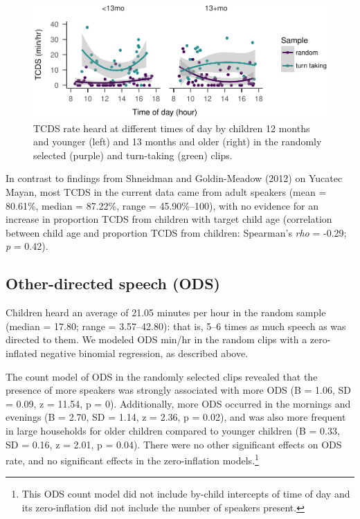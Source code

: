 \documentclass[floatsintext,man]{apa6}
\theoremstyle{definition}
\theoremstyle{definition}
\theoremstyle{definition}
\theoremstyle{remark}
\begin{document}
\begin{figure}
\centering
\includegraphics{Tseltal-CLE_files/figure-latex/fig5-1.pdf}
\caption{\label{fig:fig5}TCDS rate heard at different times of day by
children 12 months and younger (left) and 13 months and older (right) in
the randomly selected (purple) and turn-taking (green) clips.}
\end{figure}

In contrast to findings from Shneidman and Goldin-Meadow (2012) on
Yucatec Mayan, most TCDS in the current data came from adult speakers
(mean = 80.61\%, median = 87.22\%, range = 45.90\%--100), with no
evidence for an increase in proportion TCDS from children with target
child age (correlation between child age and proportion TCDS from
children: Spearman's \emph{rho} = -0.29; \emph{p} = 0.42).

\subsection{Other-directed speech
(ODS)}\label{other-directed-speech-ods}

Children heard an average of 21.05 minutes per hour in the random sample
(median = 17.80; range = 3.57--42.80): that is, 5--6 times as much
speech as was directed to them. We modeled ODS min/hr in the random
clips with a zero-inflated negative binomial regression, as described
above.

The count model of ODS in the randomly selected clips revealed that the
presence of more speakers was strongly associated with more ODS (B =
1.06, SD = 0.09, z = 11.54, p = 0). Additionally, more ODS occurred in
the mornings and evenings (B = 2.70, SD = 1.14, z = 2.36, p = 0.02), and
was also more frequent in large households for older children compared
to younger children (B = 0.33, SD = 0.16, z = 2.01, p = 0.04). There
were no other significant effects on ODS rate, and no significant
effects in the zero-inflation models.\footnote{This ODS count model did
  not include by-child intercepts of time of day and its zero-inflation
  did not include the number of speakers present.}
\end{document}

